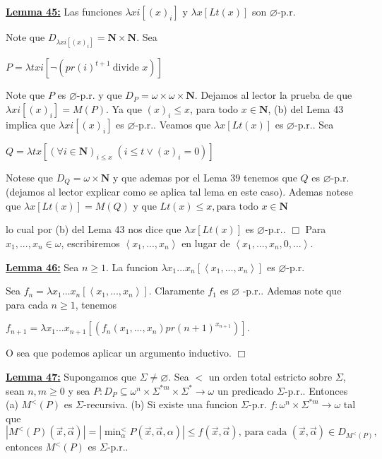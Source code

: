 \textbf{\underline{Lemma 45:}} Las funciones \(\lambda xi\left[ (x)_{i}\right] \) y \(\lambda x\left[ Lt(x) \right] \) son \(\varnothing \)-p.r.

\PROOF Note que \(D_{\lambda xi\left[ (x)_{i}\right] }=\mathbf{N}\times \mathbf{N}\). Sea

\(\displaystyle P=\lambda txi\left[ \lnot (pr(i)^{t+1}\ \text{divide }x)\right] \)

Note que \(P\) es \(\varnothing \)-p.r. y que \(D_{P}=\omega \times \omega \times \mathbf{N}\). Dejamos al lector la prueba de que \(\lambda xi\left[ (x)_{i} \right] =M(P)\). Ya que \((x)_{i}\leq x\), para todo \(x\in \mathbf{N}\), (b) del Lema 43 implica que \(\lambda xi\left[ (x)_{i}\right] \) es \( \varnothing \)-p.r..
Veamos que \(\lambda x\left[ Lt(x)\right] \) es \(\varnothing \)-p.r.. Sea

\(\displaystyle Q=\lambda tx\left[ (\forall i\in \mathbf{N})_{i\leq x}\;(i\leq t\vee (x)_{i}=0)\right] \)

Notese que \(D_{Q}=\omega \times \mathbf{N}\) y que ademas por el Lema 39 tenemos que \(Q\) es \(\varnothing \)-p.r. (dejamos al lector explicar como se aplica tal lema en este caso). Ademas notese que \(\lambda x \left[ Lt(x)\right] =M(Q)\) y que
\(\displaystyle Lt(x)\leq x,\text{para todo }x\in \mathbf{N} \)

lo cual por (b) del Lema 43 nos dice que \(\lambda x\left[ Lt(x)\right] \) es \(\varnothing \)-p.r.. \(\Box\)
Para \(x_{1},...,x_{n}\in \omega \), escribiremos \(\left\langle x_{1},...,x_{n}\right\rangle \) en lugar de \(\left\langle x_{1},...,x_{n},0,...\right\rangle \).



\textbf{\underline{Lemma 46:}} Sea \(n\geq 1\). La funcion \(\lambda x_{1}...x_{n}\left[ \left\langle x_{1},...,x_{n}\right\rangle \right] \) es \(\varnothing \)-p.r.

\PROOF Sea \(f_{n}=\lambda x_{1}...x_{n}\left[ \left\langle x_{1},...,x_{n}\right\rangle \right] \). Claramente \(f_{1}\) es \(\varnothing \) -p.r.. Ademas note que para cada \(n\geq 1\), tenemos

\(\displaystyle f_{n+1}=\lambda x_{1}...x_{n+1}\left[ \left( f_{n}(x_{1},...,x_{n})pr(n+1)^{x_{n+1}}\right) \right] \text{.} \)

O sea que podemos aplicar un argumento inductivo. \(\Box\)


\textbf{\underline{Lemma 47:}} Supongamos que \(\Sigma \neq \varnothing \). Sea \(< \) un orden total estricto sobre \(\Sigma \), sean \(n,m\geq 0\) y sea \( P:D_{P}\subseteq \omega ^{n}\times \Sigma ^{\ast m}\times \Sigma ^{\ast }\rightarrow \omega \) un predicado \(\Sigma \)-p.r.. Entonces
(a) \(M^{< }(P)\) es \(\Sigma \)-recursiva.
(b) Si existe una funcion \(\Sigma \)-p.r. \(f:\omega ^{n}\times \Sigma ^{\ast m}\rightarrow \omega \) tal que
\(\displaystyle \left\vert M^{< }(P)(\vec{x},\vec{\alpha})\right\vert =\left\vert \min\nolimits_{\alpha }^{< }P(\vec{x},\vec{\alpha},\alpha )\right\vert \leq f( \vec{x},\vec{\alpha})\text{, para cada }(\vec{x},\vec{\alpha})\in D_{M^{< }(P)}\text{,} \)
entonces \(M^{< }(P)\) es \(\Sigma \)-p.r..

